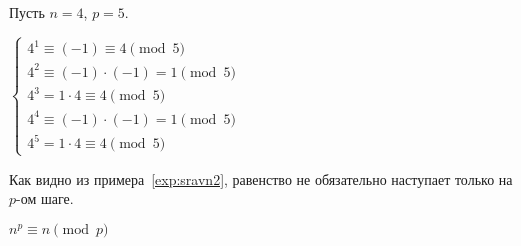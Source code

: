 \documentclass[russian]{lecture-notes}
\begin{document}
\begin{example*}
	Пусть $n=4$, $p=5$.
	
	$\begin{cases}
	4^1 \equiv (-1) \equiv 4 \pmod 5
	\\
	4^2 \equiv (-1) \cdot (-1) = 1 \pmod 5
	\\
	4^3 = 1 \cdot 4 \equiv 4 \pmod 5
	\\
	4^4 \equiv (-1) \cdot (-1) = 1 \pmod 5
	\\
	4^5 = 1 \cdot 4 \equiv 4 \pmod 5
	\end{cases}$
	\label{exp:sravn2}
\end{example*}

\begin{note}
	Как видно из примера~\ref{exp:sravn2}, равенство не обязательно наступает только на $p$-ом шаге.
\end{note}

\begin{theorem}
	$n^p \equiv n \pmod p$
\end{theorem}
\end{document}
